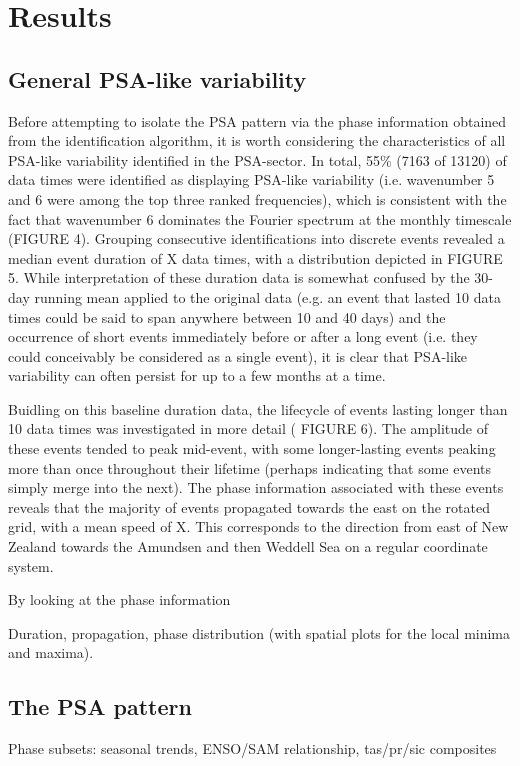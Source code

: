 \section{Results}

\subsection{General PSA-like variability}

Before attempting to isolate the PSA pattern via the phase information obtained from the identification algorithm, it is worth considering the characteristics of all PSA-like variability identified in the PSA-sector. In total, 55\% (7163 of 13120) of data times were identified as displaying PSA-like variability (i.e. wavenumber 5 and 6 were among the top three ranked frequencies), which is consistent with the fact that wavenumber 6 dominates the Fourier spectrum at the monthly timescale (FIGURE 4). Grouping consecutive identifications into discrete events revealed a median event duration of X data times, with a distribution depicted in FIGURE 5. While interpretation of these duration data is somewhat confused by the 30-day running mean applied to the original data (e.g. an event that lasted 10 data times could be said to span anywhere between 10 and 40 days) and the occurrence of short events immediately before or after a long event (i.e. they could conceivably be considered as a single event), it is clear that PSA-like variability can often persist for up to a few months at a time.     

Buidling on this baseline duration data, the lifecycle of events lasting longer than 10 data times was investigated in more detail ( FIGURE 6). The amplitude of these events tended to peak mid-event, with some longer-lasting events peaking more than once throughout their lifetime (perhaps indicating that some events simply merge into the next). The phase information associated with these events reveals that the majority of events propagated towards the east on the rotated grid, with a mean speed of X. This corresponds to the direction from east of New Zealand towards the Amundsen and then Weddell Sea on a regular coordinate system. 

By looking at the phase information 


Duration, propagation, phase distribution (with spatial plots for the local minima and maxima).

\subsection{The PSA pattern}

Phase subsets: seasonal trends, ENSO/SAM relationship, tas/pr/sic composites







